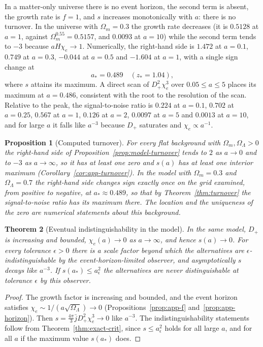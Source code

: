\documentclass[11pt,oneside]{book}
\newtheorem{theorem}{Theorem}[chapter]
\newtheorem{proposition}[theorem]{Proposition}
\theoremstyle{definition}
\theoremstyle{remark}
\begin{document}
In a matter-only universe there is no event horizon, the second term is absent, the growth rate is $f=1$, and $s$ increases monotonically with $a$: there is no turnover. In the universe with $\Omega_m=0.3$ the growth rate decreases (it is $0.5128$ at $a=1$, against $\Omega_m^{0.55}=0.5157$, and $0.0093$ at $a=10$) while the second term tends to $-3$ because $aH\chi_e\to1$. Numerically, the right-hand side is $1.472$ at $a=0.1$, $0.749$ at $a=0.3$, $-0.044$ at $a=0.5$ and $-1.604$ at $a=1$, with a single sign change at
\[
a_*=0.489\quad(z_*=1.04),
\]
where $s$ attains its maximum. A direct scan of $D_+^2\chi_e^3$ over $0.05\le a\le5$ places its maximum at $a=0.486$, consistent with the root to the resolution of the scan. Relative to the peak, the signal-to-noise ratio is $0.224$ at $a=0.1$, $0.702$ at $a=0.25$, $0.567$ at $a=1$, $0.126$ at $a=2$, $0.0097$ at $a=5$ and $0.0013$ at $a=10$, and for large $a$ it falls like $a^{-3}$ because $D_+$ saturates and $\chi_e\propto a^{-1}$.

\begin{proposition}[Computed turnover]\label{prop:computed}
For every flat background with $\Omega_m,\Omega_\Lambda>0$ the right-hand side of Proposition~\ref{prop:model-turnover} tends to $2$ as $a\to0$ and to $-3$ as $a\to\infty$, so it has at least one zero and $s(a)$ has at least one interior maximum (Corollary~\ref{cor:app-turnover}). In the model with $\Omega_m=0.3$ and $\Omega_\Lambda=0.7$ the right-hand side changes sign exactly once on the grid examined, from positive to negative, at $a_*\approx0.489$, so that by Theorem~\ref{thm:turnover} the signal-to-noise ratio has its maximum there. The location and the uniqueness of the zero are numerical statements about this background.
\end{proposition}

\begin{theorem}[Eventual indistinguishability in the model]\label{thm:model-result}
In the same model, $D_+$ is increasing and bounded, $\chi_e(a)\to0$ as $a\to\infty$, and hence $s(a)\to0$. For every tolerance $\epsilon>0$ there is a scale factor beyond which the alternatives are $\epsilon$-indistinguishable by the event-horizon-limited observer, and asymptotically $s$ decays like $a^{-3}$. If $s(a_*)\leq a_\epsilon^2$ the alternatives are never distinguishable at tolerance $\epsilon$ by this observer.
\end{theorem}

\begin{proof}
The growth factor is increasing and bounded, and the event horizon satisfies $\chi_e\sim1/(a\sqrt{\Omega_\Lambda})\to0$ (Propositions~\ref{prop:app-f} and~\ref{prop:app-horizon}). Then $s=\tfrac{4\pi}3\bar jD_+^2\chi_e^3\to0$ like $a^{-3}$. The indistinguishability statements follow from Theorem~\ref{thm:exact-crit}, since $s\leq a_\epsilon^2$ holds for all large $a$, and for all $a$ if the maximum value $s(a_*)$ does.
\end{proof}
\end{document}
